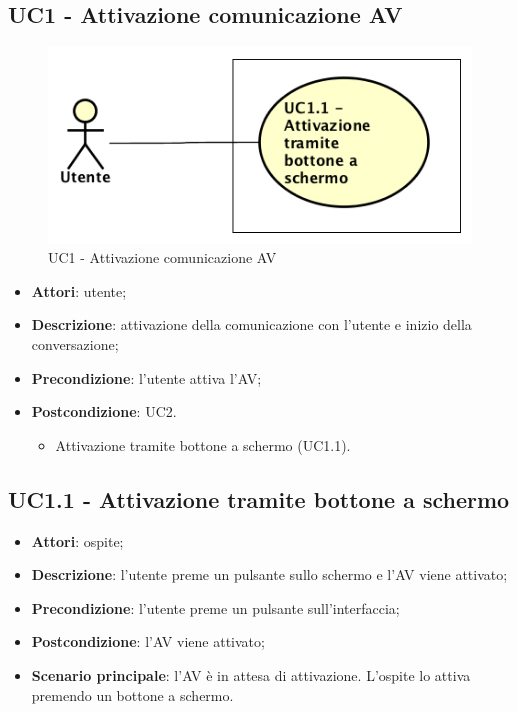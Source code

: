 \documentclass[../AnalisiDeiRequisiti.tex]{subfiles}
\begin{document}
\subsection{UC1 - Attivazione comunicazione AV}
\begin{figure}[!h]
	\centering
	\includegraphics[width=\textwidth]{UseCases/UC1-Attivazione/UC1.png}
	\caption{UC1 - Attivazione comunicazione AV}
\end{figure}	
\label{sssec:UC1} 
\begin{itemize} 
\item \textbf{Attori}: utente;
\item \textbf{Descrizione}: attivazione della comunicazione con l'utente e inizio della conversazione;
\item \textbf{Precondizione}: l'utente attiva l'AV;
\item \textbf{Postcondizione}: UC2.
\begin{itemize}
	\item Attivazione tramite bottone a schermo (UC1.1).
\end{itemize}
\end{itemize} 
\subsection{UC1.1 - Attivazione tramite bottone a schermo} 
\label{sssec:UC1.1} 
\begin{itemize} 
\item \textbf{Attori}: ospite;
\item \textbf{Descrizione}: l'utente preme un pulsante sullo schermo e l'AV viene attivato;
\item \textbf{Precondizione}: l'utente preme un pulsante sull'interfaccia;
\item \textbf{Postcondizione}: l'AV viene attivato;
\item \textbf{Scenario principale}: l'AV è in attesa di attivazione. L'ospite lo attiva premendo un bottone a schermo.\end{itemize} 
\newpage
\end{document}
